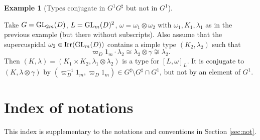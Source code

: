 \documentclass[11pt]{amsart}
\theoremstyle{definition}
\newtheorem{ex}[thm]{Example}
\begin{document}
\begin{ex}[Types conjugate in $G^1 G^\sharp$ but not in $G^1$] 
\ \label{ex:5.3}

Take $G = {{\rm GL}}_{2m} (D)$, $L = {{\rm GL}}_m (D)^2$, $\omega = \omega_1 \otimes \omega_2$
with $\omega_1,K_1,\lambda_1$ as in the previous example (but there
without subscripts). Also assume that the supercuspidal $\omega_2 \in {{\rm Irr}} ({{\rm GL}}_m (D))$
contains a simple type $(K_2,\lambda_2)$ such that 
\[
\varpi_D 1_m \cdot \lambda_2 \cong \lambda_2 \otimes \gamma \not\cong \lambda_2 .
\]
Then $(K,\lambda) = (K_1 \times K_2,\lambda_1 \otimes \lambda_2)$ is a type for
$[L,\omega]_L$. It is conjugate to $(K,\lambda \otimes \gamma)$ by
$(\varpi_D^{-1} 1_m,\varpi_D 1_m) \in G^\sharp \setminus G^\sharp \cap G^1$, but not
by an element of $G^1$.
\end{ex}

\section{Index of notations}  

This index is supplementary to the notations and conventions in Section \ref{sec:not}.\\
\end{document}
